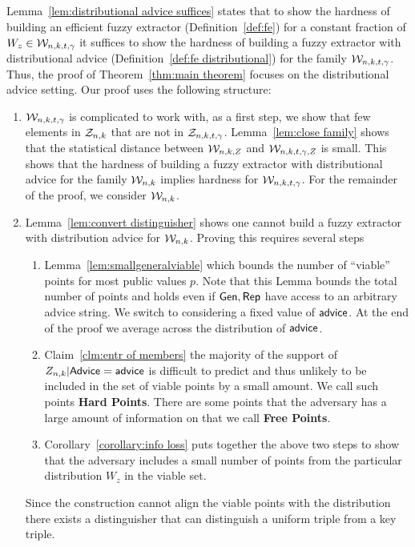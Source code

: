 Lemma~\ref{lem:distributional advice suffices} states that to show the hardness of building an efficient fuzzy extractor (Definition~\ref{def:fe}) for a constant fraction of $W_z\in \mathcal{W}_{n,k,t,\gamma}$ it suffices to show the hardness of building a fuzzy extractor with distributional advice (Definition~\ref{def:fe distributional}) for the family $\mathcal{W}_{n,k,t,\gamma}$. Thus, the proof of Theorem~\ref{thm:main theorem} focuses on the distributional advice setting.
Our proof uses the following structure:
\begin{enumerate}

\item $\mathcal{W}_{n,k,t,\gamma}$ is complicated to work with, as a first step, we show that few elements in $\mathcal{Z}_{n,k}$ that are not in $\mathcal{Z}_{n,k,t,\gamma}$. Lemma~\ref{lem:close family} shows that the statistical distance between $\mathcal{W}_{n,k, Z}$ and $\mathcal{W}_{n,k,t,\gamma, Z}$ is small.  This shows that the hardness of building a fuzzy extractor with distributional advice for the family $\mathcal{W}_{n,k}$ implies hardness for $\mathcal{W}_{n,k,t,\gamma}$. For the remainder of the proof, we consider $\mathcal{W}_{n,k}$.
\item Lemma~\ref{lem:convert distinguisher} shows one cannot build a fuzzy extractor with distribution advice for $\mathcal{W}_{n,k}$. Proving this requires several steps
\begin{enumerate}
\item Lemma~\ref{lem:smallgeneralviable} which bounds the number of ``viable'' points for most public values $p$.  Note that this Lemma bounds the total number of points and holds even if ${\mathsf{Gen}}, {\mathsf{Rep}}$ have access to an arbitrary advice string. We switch to considering a fixed value of ${\mathsf{advice}}$.  At the end of the proof we average across the distribution of ${\mathsf{advice}}$.

\item Claim~\ref{clm:entr of members} the majority of the support of $Z_{n,k} | {\mathsf{Advice}} = {\mathsf{advice}}$ is difficult to predict and thus unlikely to be included in the set of viable points by a small amount. We call such points \textbf{Hard Points}.  There are some points that the adversary has a large amount of information on that we call \textbf{Free Points}.

\item Corollary~\ref{corollary:info loss} puts together the above two steps to show that the adversary includes a small number of points from the particular distribution $W_z$ in the viable set. 

\end{enumerate}

Since the construction cannot align the viable points with the distribution there exists a distinguisher that can distinguish a uniform triple from a key triple. 
\end{enumerate}

